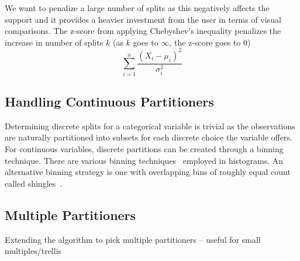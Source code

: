 We want to penalize a large number of splits as this negatively affects the support and it provides a heavier investment from the user in terms of visual comparisons. The z-score from applying Chebyshev's inequality  penalizes the increase in number of splits $k$ (as $k$ goes to $\infty$, the z-score goes to $0$)
$$\sum_{i=1}^n \frac{(X_i-\mu_i)^2}{\sigma_i^2}$$

\subsection{Handling Continuous Partitioners}
Determining discrete splits for a categorical variable is trivial as the observations are naturally partitioned into subsets for each discrete choice the variable offers. For continuous variables, discrete partitions can be created through a binning technique. There are various binning techniques~\cite{Fried-Diach,Sturges} employed in histograms. An alternative binning strategy is one with overlapping bins of roughly equal count called shingles~\cite{Becker1996 ?Cleveland book first??}.

\subsection{Multiple Partitioners}
Extending the algorithm to pick multiple partitioners -- useful for small multiples/trellis


